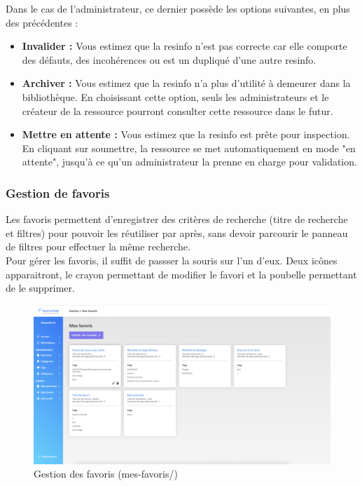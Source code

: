 Dans le cas de l'administrateur, ce dernier possède les options suivantes, en plus des précédentes :

\begin{itemize}
    \item \textbf{Invalider :} Vous estimez que la \gls{resinfo} n'est pas correcte car elle comporte des défauts, des incohérences ou est un dupliqué d'une autre \gls{resinfo}.
    \item \textbf{Archiver :} Vous estimez que la \gls{resinfo} n'a plus d'utilité à demeurer dans la bibliothèque. En choisissant cette option, seuls les administrateurs et le créateur de la ressource pourront consulter cette ressource dans le futur.
    \item \textbf{Mettre en attente :} Vous estimez que la \gls{resinfo} est prête pour inspection. En cliquant sur soumettre, la ressource se met automatiquement en mode "en attente", jusqu'à ce qu'un administrateur la prenne en charge pour validation.
\end{itemize}

\subsubsection{Gestion de favoris}
\label{section:gestionFavorite}

Les favoris permettent d'enregistrer des critères de recherche (titre de recherche et filtres) pour pouvoir les réutiliser par après, sans devoir parcourir le panneau de filtres pour effectuer la même recherche.\\

Pour gérer les favoris, il suffit de passser la souris sur l'un d'eux. Deux icônes apparaitront, le crayon permettant de modifier le favori et la poubelle permettant de le supprimer.

\begin{figure}[H]
    \includegraphics[width=\textwidth,height=\textheight,keepaspectratio]{images/client/gestion-favorite.png}
    \caption[SourceCode : gestion des favoris]{Gestion des favoris (mes-favoris/)}
\end{figure}

